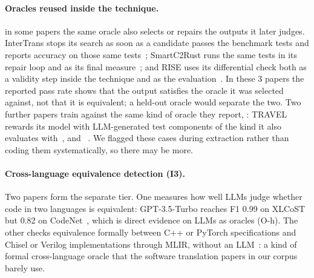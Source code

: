 \begin{added}
\paragraph{Oracles reused inside the technique.}  in some papers the same oracle also selects or repairs the outputs it later judges. InterTrans stops its search as soon as a candidate passes the benchmark tests and reports accuracy on those same tests~\cite{intertrans}; SmartC2Rust runs the same tests in its repair loop and as its final measure~\cite{smartc2rust}; and RISE uses its differential check both as a validity step inside the technique and as the evaluation~\cite{rise}. In these 3 papers the reported pass rate shows that the output satisfies the oracle it was selected against, not that it is equivalent; a held-out oracle would separate the two. Two further papers train  against the same kind of oracle they report, : TRAVEL rewards its model with LLM-generated test components of the kind it also evaluates with~\cite{travel}, and ~\cite{dgir}. We flagged these cases during extraction rather than coding them systematically, so there may be more.
\end{added}

\paragraph{Cross-language equivalence detection (I3).} Two papers form the separate tier. One measures how well LLMs judge whether code in two languages is equivalent: GPT-3.5-Turbo reaches F1 0.99 on XLCoST but 0.82 on CodeNet~\cite{moumoula}, which is direct evidence on LLMs as oracles (O-h). The other checks equivalence formally between C++ or PyTorch specifications and Chisel or Verilog implementations through MLIR, without an LLM~\cite{equivfusion}: a kind of formal cross-language oracle that the software translation papers in our corpus barely use.
